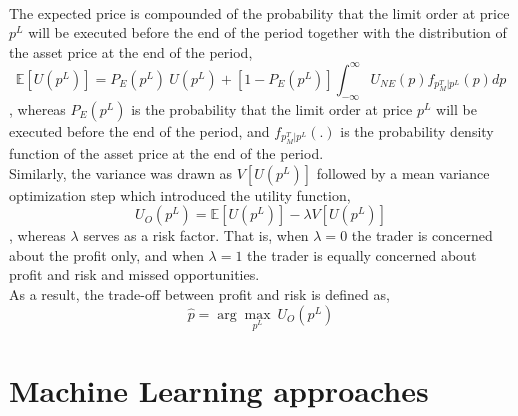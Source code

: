 \hfill
\\
The expected price is compounded of the probability that the limit order at price $p^L$ will be executed before the end of the period together with the distribution of the asset price at the end of the period,
\begin{equation}
    \mathbb{E}[U(p^L)] = P_E(p^L)\ U(p^L) + [1-P_E(p^L)] \int_{-\infty}^{\infty} U_{NE}(p) f_{p_M^T | p^L}(p) dp
\end{equation}
, whereas $P_E(p^L)$ is the probability that the limit order at price $p^L$ will be executed before the end of the period, and $f_{p_M^T | p^L}(.)$ is the probability density function of the asset price at the end of the period. 
\\
Similarly, the variance was drawn as $V[U(p^L)]$ followed by a mean variance optimization step which introduced the utility function,
\begin{equation}
    U_O(p^L) = \mathbb{E}[U(p^L)] - \lambda V[U(p^L)]
\end{equation}
, whereas $\lambda$ serves as a risk factor.
That is, when $\lambda=0$ the trader is concerned about the profit only, and when $\lambda=1$ the trader is equally concerned about profit and risk and missed opportunities.
\\
As a result, the trade-off between profit and risk is defined as,
\begin{equation}
    \hat{p} = \arg\max_{p^L}\ U_O(p^L)
\end{equation}


\section{Machine Learning approaches}